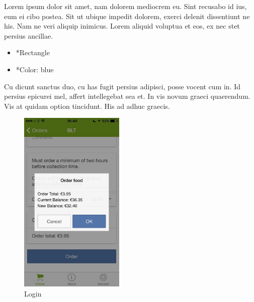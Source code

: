 \begin{minipage}{0.55\textwidth}
	Lorem ipsum dolor sit amet, nam dolorem mediocrem eu. Sint recusabo id ius, eum ei cibo postea. Sit ut ubique impedit dolorem, exerci delenit dissentiunt ne his. Nam ne veri aliquip inimicus. Lorem aliquid voluptua et eos, ex nec stet persius ancillae.
	\begin{itemize}
		\item *Rectangle
		\item *Color: blue
	\end{itemize}
	Cu dicunt sanctus duo, cu has fugit persius adipisci, posse vocent cum in. Id persius epicurei mel, affert intellegebat sea et. In vis novum graeci quaerendum. Vis at quidam option tincidunt. His ad adhuc graecis.
\end{minipage}
\begin{minipage}{5cm}
	\begin{figure}[H]
		\includegraphics[width=5cm]{img/mobile-app/screen-shots/IMG_2910.jpg}
		\caption{Login}
	\end{figure}
\end{minipage} \hfill

